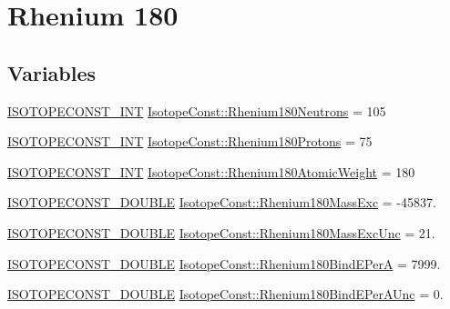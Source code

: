 \hypertarget{group___isotope_const-_rhenium-_re180}{}\section{Rhenium 180}
\label{group___isotope_const-_rhenium-_re180}
\subsection*{Variables}
\begin{DoxyCompactItemize}
\item 
\mbox{\hyperlink{group___isotope_const-_macros_ga5f18360b3e99483a35c32d789e62621c}{I\+S\+O\+T\+O\+P\+E\+C\+O\+N\+S\+T\+\_\+\+I\+NT}} \mbox{\hyperlink{group___isotope_const-_rhenium-_re180_gad0ebbe09197d306b4cb5c97c57738c71}{Isotope\+Const\+::\+Rhenium180\+Neutrons}} = 105
\item 
\mbox{\hyperlink{group___isotope_const-_macros_ga5f18360b3e99483a35c32d789e62621c}{I\+S\+O\+T\+O\+P\+E\+C\+O\+N\+S\+T\+\_\+\+I\+NT}} \mbox{\hyperlink{group___isotope_const-_rhenium-_re180_ga4153861e990bcd2d0127f8ce9737bca9}{Isotope\+Const\+::\+Rhenium180\+Protons}} = 75
\item 
\mbox{\hyperlink{group___isotope_const-_macros_ga5f18360b3e99483a35c32d789e62621c}{I\+S\+O\+T\+O\+P\+E\+C\+O\+N\+S\+T\+\_\+\+I\+NT}} \mbox{\hyperlink{group___isotope_const-_rhenium-_re180_ga8892d7805433a9ed6583c67902c74cbf}{Isotope\+Const\+::\+Rhenium180\+Atomic\+Weight}} = 180
\item 
\mbox{\hyperlink{group___isotope_const-_macros_ga8f45a7272ce02c0b4c65c44636ed719a}{I\+S\+O\+T\+O\+P\+E\+C\+O\+N\+S\+T\+\_\+\+D\+O\+U\+B\+LE}} \mbox{\hyperlink{group___isotope_const-_rhenium-_re180_gaa16a5c13af05d2fca5eeec8e621625ec}{Isotope\+Const\+::\+Rhenium180\+Mass\+Exc}} = -\/45837.
\item 
\mbox{\hyperlink{group___isotope_const-_macros_ga8f45a7272ce02c0b4c65c44636ed719a}{I\+S\+O\+T\+O\+P\+E\+C\+O\+N\+S\+T\+\_\+\+D\+O\+U\+B\+LE}} \mbox{\hyperlink{group___isotope_const-_rhenium-_re180_ga87c3d5389fe40e25529023dc044e8309}{Isotope\+Const\+::\+Rhenium180\+Mass\+Exc\+Unc}} = 21.
\item 
\mbox{\hyperlink{group___isotope_const-_macros_ga8f45a7272ce02c0b4c65c44636ed719a}{I\+S\+O\+T\+O\+P\+E\+C\+O\+N\+S\+T\+\_\+\+D\+O\+U\+B\+LE}} \mbox{\hyperlink{group___isotope_const-_rhenium-_re180_gaa024fd85309890ba925e6b0438b51f33}{Isotope\+Const\+::\+Rhenium180\+Bind\+E\+PerA}} = 7999.
\item 
\mbox{\hyperlink{group___isotope_const-_macros_ga8f45a7272ce02c0b4c65c44636ed719a}{I\+S\+O\+T\+O\+P\+E\+C\+O\+N\+S\+T\+\_\+\+D\+O\+U\+B\+LE}} \mbox{\hyperlink{group___isotope_const-_rhenium-_re180_ga083340a435613c746b0cbca65fb9cd2d}{Isotope\+Const\+::\+Rhenium180\+Bind\+E\+Per\+A\+Unc}} = 0.

\end{DoxyCompactItemize}
